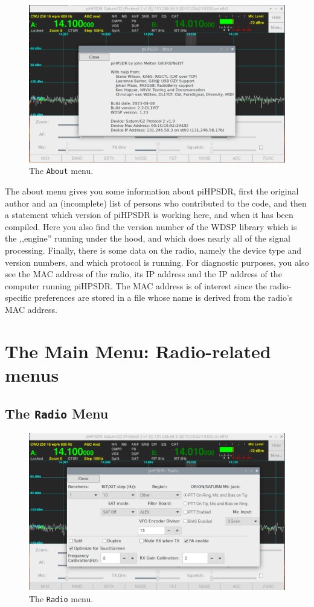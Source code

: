 \documentclass[12pt]{book}
\begin{document}
\begin{figure}[h]
\center
\includegraphics[width=12cm]{AboutMenu.png}
\caption{The \texttt{About} menu.}
\end{figure}

The about menu gives you some information about piHPSDR, first the original author
and an (incomplete) list
of persons who contributed to the code, and then a statement which version of piHPSDR
is working here, and when it has been compiled. Here you also find the version number of the WDSP
 library which is the ,,engine''
running under the hood, and which does nearly all of the signal processing. Finally, there is
some data on the radio, namely the device type and version numbers, and which protocol is running.
For diagnostic purposes, you also see the MAC address of the radio, its IP address and the
IP address of the computer running piHPSDR. The MAC address is of interest since the radio-specific
preferences are stored in a file whose name is derived from the radio's MAC address.

\chapter{The Main Menu: Radio-related menus}
\section{The \texttt{Radio} Menu}
\begin{figure}[h]
\center
\includegraphics[width=12cm]{RadioMenu.png}
\caption{The \texttt{Radio} menu.}
\label{fig:RadioMenu}
\end{figure}
\end{document}
